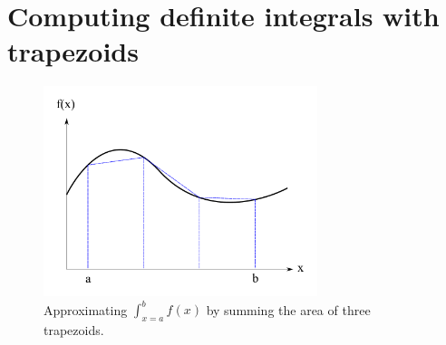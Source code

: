 \documentclass{tmr}
\begin{document}



\section{Computing definite integrals with trapezoids}

\begin{figure}[t]
\centering
\includegraphics[width=8cm]{integral_diag.pdf}
\caption{Approximating $\int_{x=a}^{b} f(x)$ by summing the area of three trapezoids.
\label{trapezoidfig}}
\end{figure}
\end{document}
